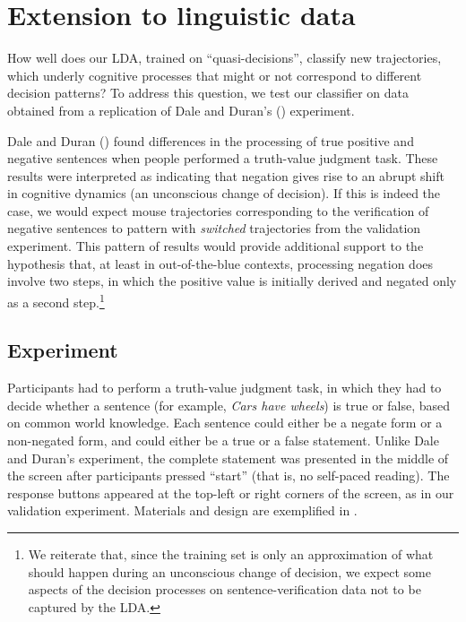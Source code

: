 \documentclass[draft]{article}
\newcommand{\nbEC}[1]{{\leavevmode\color{blue}{\scriptsize#1}}}
\begin{document}
\nbEC{This paragraph is needed, but I don't know how to present it: it is odd on its own as a section, but it is also odd as part of the previous paragraph which is only about (iii). It could be an introduction to the next section, but I fear it won't be salient enough. I am not sure what to do then.}

\section{Extension to linguistic data}
\label{section:replication}
How well does our LDA, trained on “quasi-decisions”, classify new trajectories, which underly cognitive processes that might or not correspond to different decision patterns? To address this question, we test our classifier on data obtained from a replication of Dale and Duran's (\citeyear{Dale2011}) experiment.   
 
Dale and Duran (\citeyear{Dale2011}) found differences in the processing of true positive and negative sentences when people performed a truth-value judgment task. These results were interpreted as indicating that negation gives rise to an abrupt shift in cognitive dynamics (an unconscious change of decision). If this is indeed the case, we would expect mouse trajectories corresponding to the verification of negative sentences to pattern with \emph{switched} trajectories from the validation experiment. This pattern of results would provide additional support to the hypothesis that, at least in out-of-the-blue contexts, processing negation does involve two steps, in which the positive value is initially derived and negated only as a second step.\footnote{We reiterate that, since the training set is only an approximation of what should happen during an unconscious change of decision, we expect some aspects of the decision processes on sentence-verification data not to be captured by the LDA.}

\subsection{Experiment}
Participants had to perform a truth-value judgment task, in which they had to decide whether a sentence (for example, \textit{Cars have wheels}) is true or false, based on common world knowledge. Each sentence could either be a negate form or a non-negated form, and could either be a true or a false statement.
Unlike Dale and Duran's experiment, the complete statement was presented in the middle of the screen after participants pressed ``start'' (that is, no self-paced reading). The response buttons appeared at the top-left or right corners of the screen, as in our validation experiment.  
Materials and design are exemplified in . 
\end{document}
